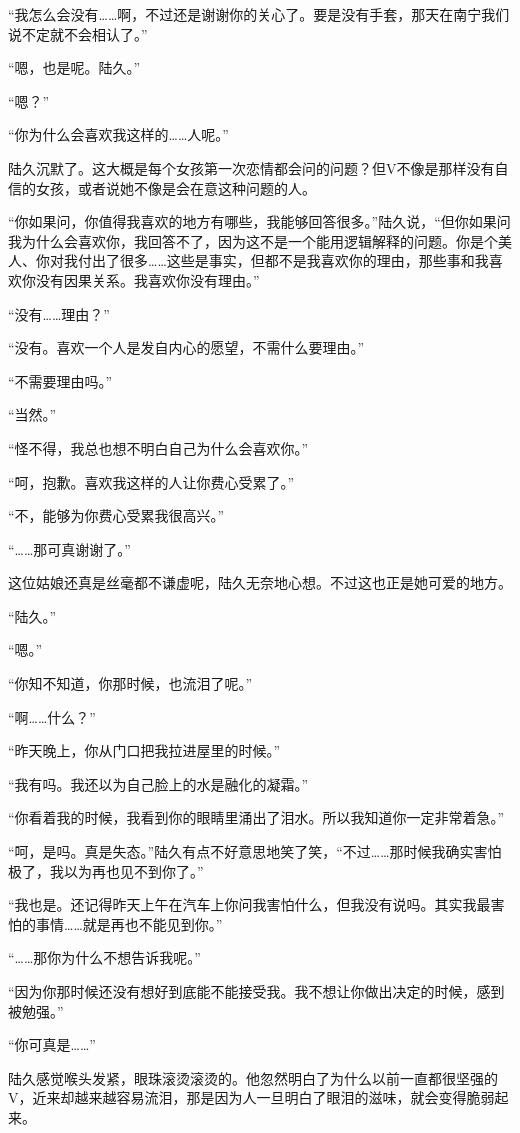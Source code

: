 “我怎么会没有……啊，不过还是谢谢你的关心了。要是没有手套，那天在南宁我们说不定就不会相认了。”

“嗯，也是呢。陆久。”

“嗯？”

“你为什么会喜欢我这样的……人呢。”

陆久沉默了。这大概是每个女孩第一次恋情都会问的问题？但V不像是那样没有自信的女孩，或者说她不像是会在意这种问题的人。

“你如果问，你值得我喜欢的地方有哪些，我能够回答很多。”陆久说，“但你如果问我为什么会喜欢你，我回答不了，因为这不是一个能用逻辑解释的问题。你是个美人、你对我付出了很多……这些是事实，但都不是我喜欢你的理由，那些事和我喜欢你没有因果关系。我喜欢你没有理由。”

“没有……理由？”

“没有。喜欢一个人是发自内心的愿望，不需什么要理由。”

“不需要理由吗。”

“当然。”

“怪不得，我总也想不明白自己为什么会喜欢你。”

“呵，抱歉。喜欢我这样的人让你费心受累了。”

“不，能够为你费心受累我很高兴。”

“……那可真谢谢了。”

这位姑娘还真是丝毫都不谦虚呢，陆久无奈地心想。不过这也正是她可爱的地方。

“陆久。”

“嗯。”

“你知不知道，你那时候，也流泪了呢。”

“啊……什么？”

“昨天晚上，你从门口把我拉进屋里的时候。”

“我有吗。我还以为自己脸上的水是融化的凝霜。”

“你看着我的时候，我看到你的眼睛里涌出了泪水。所以我知道你一定非常着急。”

“呵，是吗。真是失态。”陆久有点不好意思地笑了笑，“不过……那时候我确实害怕极了，我以为再也见不到你了。”

“我也是。还记得昨天上午在汽车上你问我害怕什么，但我没有说吗。其实我最害怕的事情……就是再也不能见到你。”

“……那你为什么不想告诉我呢。”

“因为你那时候还没有想好到底能不能接受我。我不想让你做出决定的时候，感到被勉强。”

“你可真是……”

陆久感觉喉头发紧，眼珠滚烫滚烫的。他忽然明白了为什么以前一直都很坚强的V，近来却越来越容易流泪，那是因为人一旦明白了眼泪的滋味，就会变得脆弱起来。

